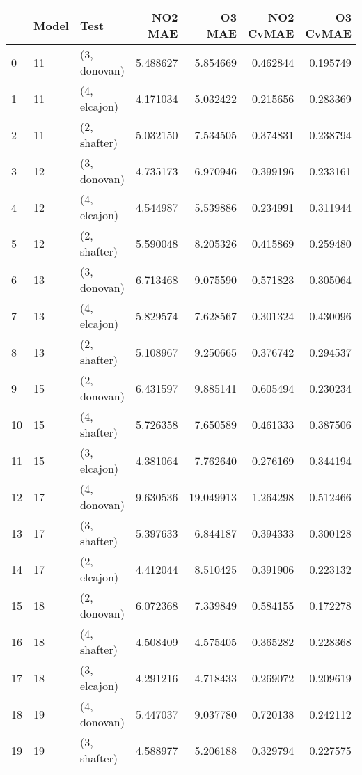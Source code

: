 \begin{tabular}{lllrrrr}
\toprule
{} & Model &          Test &    NO2 MAE &     O3 MAE &  NO2 CvMAE &  O3 CvMAE \\
\midrule
0  &    11 &  (3, donovan) &   5.488627 &   5.854669 &   0.462844 &  0.195749 \\
1  &    11 &  (4, elcajon) &   4.171034 &   5.032422 &   0.215656 &  0.283369 \\
2  &    11 &  (2, shafter) &   5.032150 &   7.534505 &   0.374831 &  0.238794 \\
3  &    12 &  (3, donovan) &   4.735173 &   6.970946 &   0.399196 &  0.233161 \\
4  &    12 &  (4, elcajon) &   4.544987 &   5.539886 &   0.234991 &  0.311944 \\
5  &    12 &  (2, shafter) &   5.590048 &   8.205326 &   0.415869 &  0.259480 \\
6  &    13 &  (3, donovan) &   6.713468 &   9.075590 &   0.571823 &  0.305064 \\
7  &    13 &  (4, elcajon) &   5.829574 &   7.628567 &   0.301324 &  0.430096 \\
8  &    13 &  (2, shafter) &   5.108967 &   9.250665 &   0.376742 &  0.294537 \\
9  &    15 &  (2, donovan) &   6.431597 &   9.885141 &   0.605494 &  0.230234 \\
10 &    15 &  (4, shafter) &   5.726358 &   7.650589 &   0.461333 &  0.387506 \\
11 &    15 &  (3, elcajon) &   4.381064 &   7.762640 &   0.276169 &  0.344194 \\
12 &    17 &  (4, donovan) &   9.630536 &  19.049913 &   1.264298 &  0.512466 \\
13 &    17 &  (3, shafter) &   5.397633 &   6.844187 &   0.394333 &  0.300128 \\
14 &    17 &  (2, elcajon) &   4.412044 &   8.510425 &   0.391906 &  0.223132 \\
15 &    18 &  (2, donovan) &   6.072368 &   7.339849 &   0.584155 &  0.172278 \\
16 &    18 &  (4, shafter) &   4.508409 &   4.575405 &   0.365282 &  0.228368 \\
17 &    18 &  (3, elcajon) &   4.291216 &   4.718433 &   0.269072 &  0.209619 \\
18 &    19 &  (4, donovan) &   5.447037 &   9.037780 &   0.720138 &  0.242112 \\
19 &    19 &  (3, shafter) &   4.588977 &   5.206188 &   0.329794 &  0.227575 \\

\end{tabular}
